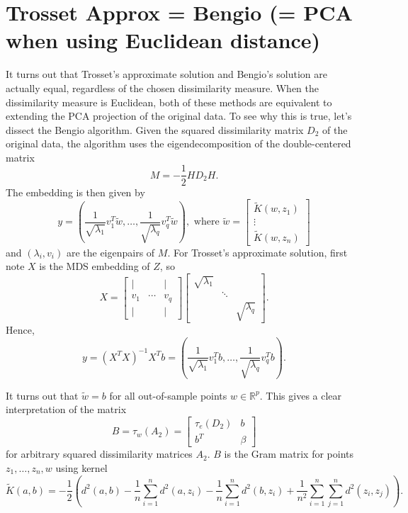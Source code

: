 \documentclass{article}
\begin{document}
\section{Trosset Approx = Bengio (= PCA when using Euclidean distance)}
It turns out that Trosset's approximate solution and Bengio's solution are actually equal, regardless of the chosen dissimilarity measure. When the dissimilarity measure is Euclidean, both of these methods are equivalent to extending the PCA projection of the original data. To see why this is true, let's dissect the Bengio algorithm. Given the squared dissimilarity matrix $D_2$ of the original data, the algorithm uses the eigendecomposition of the double-centered matrix $$M = -\frac{1}{2}HD_2H.$$ The embedding is then given by $$y = \left(\frac{1}{\sqrt{\lambda_1}} v_1^T\tilde{w}, \hdots, \frac{1}{\sqrt{\lambda_q}} v_q^T\tilde{w}\right), \textrm{ where } \tilde{w} = 
\begin{bmatrix}
\tilde{K}(w, z_1) \\
\vdots \\
\tilde{K}(w, z_n)
\end{bmatrix}$$  and $(\lambda_i, v_i)$ are the eigenpairs of $M$. For Trosset's approximate solution, first note $X$ is the MDS embedding of $Z$, so $$X = \begin{bmatrix}
\vert & & \vert \\
v_1 & \cdots & v_q \\
\vert & & \vert
\end{bmatrix}
\begin{bmatrix}
\sqrt{\lambda_1} & & \\
& \ddots & \\
& & \sqrt{\lambda_q}
\end{bmatrix}.$$ Hence, $$y = (X^TX)^{-1}X^Tb = \left(\frac{1}{\sqrt{\lambda_1}} v_1^Tb, \hdots, \frac{1}{\sqrt{\lambda_q}} v_q^Tb\right).$$

\bigbreak It turns out that $\tilde{w} = b$ for all out-of-sample points $w \in \mathbb{R}^p$. This gives a clear interpretation of the matrix $$B = \tau_w(A_2) = \begin{bmatrix}
\tau_e(D_2) & b \\
b^T & \beta
\end{bmatrix}$$ for arbitrary squared dissimilarity matrices $A_2$. $B$ is the Gram matrix for points $z_1, \hdots, z_n, w$ using kernel $$\tilde{K}(a,b) = -\frac{1}{2}\left( d^2(a,b) - \frac{1}{n}\sum_{i=1}^n d^2(a, z_i) - \frac{1}{n}\sum_{i=1}^n d^2(b, z_i) + \frac{1}{n^2} \sum_{i=1}^n \sum_{j=1}^n d^2(z_i, z_j)\right).$$
\end{document}
